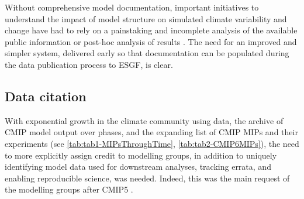 \documentclass[manuscript]{copernicus}
\newcommand{\mycomment}[1]{}
\def\cred#1{{\color{red}#1}}
\begin{document}
Without comprehensive model documentation, important initiatives to understand the impact of model structure on simulated climate variability and change have had to rely on a painstaking and incomplete analysis of the available public information \cite[e.g.][]{boe_interdependency_2018} or post-hoc analysis of results \citep[e.g.,][]{masson_climate_2011,knutti_climate_2013}. The need for an improved and simpler system, delivered early so that documentation can be populated during the data publication process to ESGF, is clear.

\mycomment{
The importance of such documentation is still recognised, and so for CMIP7, a simpler process that can be deployed early, easily maintained alongside existing CVs, and should be easier to populate has been designed. This "Essential Model Documentation" will be required before data can be published into the CMIP7 component of the ESGF.
David noted WIP telco 241022: CMIP5/Metafor \citep{guilyardi_cmip5_2011} overly constrained [drop down boxes]; CMIP6/ES-Docs \citep{pascoe_documenting_2020} too loosely constrained; CMIP7 EMD this should hopefully hit the sweet spot; Note comprehensive model documentation allows for more quantitative use of data; model genealogy \citep[e.g.,][]{masson_climate_2011,knutti_climate_2013} can be incorporated into multi-model assessment
Ron S: The notable MOM ocean model documentation needs to be noted here. It was the first complete model documentation I know and is still the best.
https://extranet.gfdl.noaa.gov/~vb/talks/curator-metafor-cmip5.pdf - CURATOR NSF funded METAFOR precursor
https://www.gfdl.noaa.gov/modeling-systems/fre/curator/
}


\subsection{Data citation}
\label{sec:DataCitation}

With exponential growth in the climate community using data, the archive of CMIP model output over phases, and the expanding list of CMIP MIPs and their experiments (see \autoref{tab:tab1-MIPsThroughTime}, \autoref{tab:tab2-CMIP6MIPs}), the need to more explicitly assign credit to modelling groups, in addition to uniquely identifying model data used for downstream analyses, tracking errata, and enabling reproducible science, was needed. Indeed, this was the main request of the modelling groups after CMIP5 \citep{williams_5th_2016}.
\end{document}
